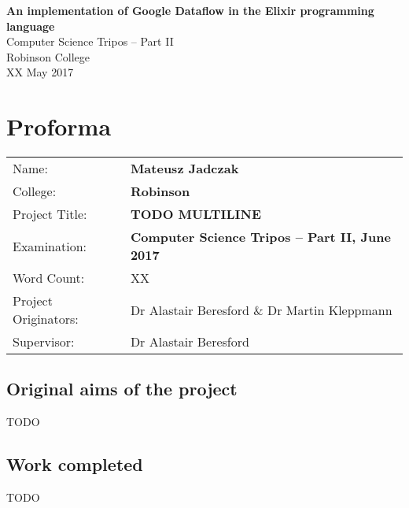 
\begin{titlepage}

\vspace*{60mm}
\begin{center}
\Huge
\textbf{An implementation of Google Dataflow in the Elixir programming language} \\[5mm]
Computer Science Tripos -- Part II \\[5mm]
Robinson College \\[5mm]
XX May 2017
\end{center}
\end{titlepage}



{\let\cleardoublepage\clearpage \chapter*{Proforma}} %

{\large
\begin{tabu}{ll}
Name:               & \textbf {Mateusz Jadczak}                       \\
College:            & \textbf {Robinson}                     \\
Project Title:      & \textbf {TODO MULTILINE} \\
Examination:        & \textbf {Computer Science Tripos -- Part II, June 2017}  \\
Word Count:         & XX\footnotemark[1]  \\
Project Originators: & Dr Alastair Beresford \& Dr Martin Kleppmann     \\
Supervisor:         &   Dr Alastair Beresford           \\ 
\end{tabu}
}

\bigskip

\section*{Original aims of the project}

TODO


\section*{Work completed}

TODO


